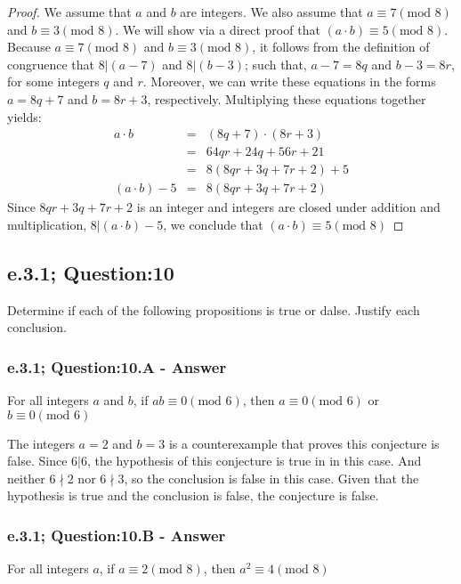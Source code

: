 \begin{proof}
We assume that $a$ and $b$ are integers. We also assume that $a \equiv 7 (\text{mod 8})$ and $b \equiv 3 (\text{mod 8})$. We will show via a direct proof that $(a \cdot b) \equiv 5 (\text{mod 8})$. Because $a \equiv 7 (\text{mod 8})$ and $b \equiv 3 (\text{mod 8})$, it follows from the definition of congruence that $8|(a-7)$ and $8|(b-3)$; such that, $a-7 = 8q$ and $b-3 = 8r$, for some integers $q$ and $r$. Moreover, we can write these equations in the forms $a = 8q + 7$ and $b = 8r + 3$, respectively. Multiplying these equations together yields: 
	\begin{eqnarray}
		a \cdot b & = & (8q + 7) \cdot (8r + 3) \nonumber \\
		& = & 64qr + 24q + 56r + 21 \nonumber \\
		& = & 8(8qr + 3q + 7r + 2) + 5 \nonumber \\
		(a \cdot b) - 5 & = & 8(8qr + 3q + 7r + 2) \nonumber
	\end{eqnarray}
Since $8qr + 3q + 7r + 2$ is an integer and integers are closed under addition and multiplication, $8 | (a \cdot b) - 5$, we conclude that $(a \cdot b) \equiv 5 (\text{mod 8})$

\end{proof}


\newpage
\subsection{e.3.1; Question:10}
Determine if each of the following propositions is true or dalse. Justify each conclusion. 

\subsubsection*{e.3.1; Question:10.A - Answer}
For all integers $a$ and $b$, if $ab \equiv 0 (\text{mod 6})$, then $a \equiv 0 (\text{mod 6})$ or $b \equiv 0 (\text{mod 6})$

The integers $a=2$ and $b=3$ is a counterexample that proves this conjecture is false. Since $6|6$, the hypothesis of this conjecture is true in in this case. And neither $6 \nmid 2$ nor $6 \nmid 3$, so the conclusion is false in this case. Given that the hypothesis is true and the conclusion is false, the conjecture is false.



\subsubsection*{e.3.1; Question:10.B - Answer}
For all integers $a$, if $a \equiv 2 (\text{mod 8})$, then $a^2 \equiv 4 (\text{mod 8})$

